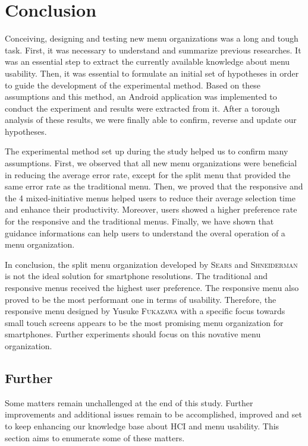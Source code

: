 \chapter{Conclusion}
Conceiving, designing and testing new menu organizations was a long and tough 
task. First, it was necessary to understand and summarize previous researches. 
It was an essential step to extract the currently available knowledge about 
menu usability. Then, it was essential to formulate an initial set of 
hypotheses in order to guide the development of the experimental method. 
Based on these assumptions and this method, an Android application was 
implemented to conduct the experiment and results were extracted from it. After 
a torough analysis of these results, we were finally able to confirm, reverse 
and update our hypotheses.\newline

The experimental method set up during the study helped us to confirm many 
assumptions. First, we observed that all new menu organizations were beneficial 
in reducing the average error rate, except for the split menu that provided 
the same error rate as the traditional menu. Then, we proved that the 
responsive and the 4 mixed-initiative menus helped users to reduce their average 
selection time and enhance their productivity. Moreover, users showed a higher 
preference rate for the responsive and the traditional menus. Finally, we 
have shown that guidance informations can help users to understand the overal 
operation of a menu organization.\newline

In conclusion, the split menu organization developed by \textsc{Sears} and 
\textsc{Shneiderman} is not the ideal solution for smartphone resolutions. The 
traditional and responsive menus received the highest user preference. The 
responsive menu also proved to be the most performant one in terms of 
usability. Therefore, the responsive menu designed by Yusuke \textsc{Fukazawa} 
with a specific focus towards small touch screens appears to be the most 
promising menu organization for smartphones. Further experiments should focus 
on this novative menu organization.

\section{Further}
Some matters remain unchallenged at the end of this study. Further 
improvements and additional issues remain to be accomplished, improved and 
set to keep enhancing our knowledge base about HCI and menu usability. This 
section aims to enumerate some of these matters.

